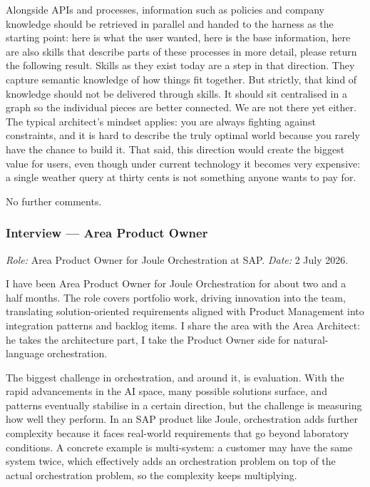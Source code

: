 Alongside APIs and processes, information such as policies and company knowledge should be retrieved in parallel and handed to the harness as the starting point: here is what the user wanted, here is the base information, here are also skills that describe parts of these processes in more detail, please return the following result. Skills as they exist today are a step in that direction. They capture semantic knowledge of how things fit together. But strictly, that kind of knowledge should not be delivered through skills. It should sit centralised in a graph so the individual pieces are better connected. We are not there yet either. The typical architect's mindset applies: you are always fighting against constraints, and it is hard to describe the truly optimal world because you rarely have the chance to build it. That said, this direction would create the biggest value for users, even though under current technology it becomes very expensive: a single weather query at thirty cents is not something anyone wants to pay for.

\medskip{}

No further comments.

\subsubsection{Interview --- Area Product Owner}

\noindent\textit{Role:} Area Product Owner for Joule Orchestration at SAP. \textit{Date:} 2 July 2026.

\medskip{}

I have been Area Product Owner for Joule Orchestration for about two and a half months. The role covers portfolio work, driving innovation into the team, translating solution-oriented requirements aligned with Product Management into integration patterns and backlog items. I share the area with the Area Architect: he takes the architecture part, I take the Product Owner side for natural-language orchestration.

\medskip{}

The biggest challenge in orchestration, and around it, is evaluation. With the rapid advancements in the AI space, many possible solutions surface, and patterns eventually stabilise in a certain direction, but the challenge is measuring how well they perform. In an SAP product like Joule, orchestration adds further complexity because it faces real-world requirements that go beyond laboratory conditions. A concrete example is multi-system: a customer may have the same system twice, which effectively adds an orchestration problem on top of the actual orchestration problem, so the complexity keeps multiplying.

